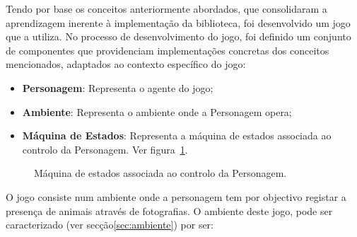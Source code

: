 Tendo por base os conceitos anteriormente abordados, que consolidaram a aprendizagem inerente à implementação da biblioteca, foi desenvolvido um jogo que a utiliza.
No processo de desenvolvimento do jogo, foi definido um conjunto de componentes que providenciam implementações concretas dos conceitos mencionados, adaptados ao contexto específico do jogo:

\begin{itemize}
    \item \textbf{Personagem}: Representa o agente do jogo;
    \item \textbf{Ambiente}: Representa o ambiente onde a Personagem opera;
    \item \textbf{Máquina de Estados}: Representa a máquina de estados associada ao controlo da Personagem.
    Ver figura~\ref{fig:projeto-parte1-maqest-personagem}.
\end{itemize}

\begin{figure}[H]
    \begin{center}
    \end{center}
    \caption{Máquina de estados associada ao controlo da Personagem.}\label{fig:projeto-parte1-maqest-personagem}
\end{figure}

O jogo consiste num ambiente onde a personagem tem por objectivo registar a presença de animais através de fotografias.
O ambiente deste jogo, pode ser caracterizado (ver secção\ref{sec:ambiente}) por ser:

